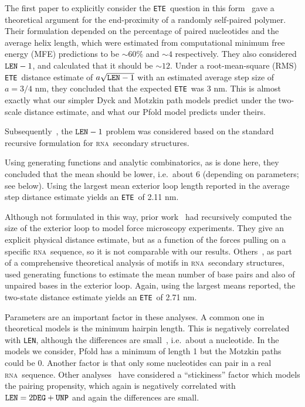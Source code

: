 \documentclass{article}
\newcommand{\RNA}{\textsc{rna}}
\newcommand{\DEG}{{\tt DEG}}
\newcommand{\UNP}{{\tt UNP}}
\newcommand{\ETE}{{\tt ETE}}
\newcommand{\LEN}{{\tt LEN}}
\begin{document}
The first paper to explicitly consider the \ETE\ question in this 
form~\cite{Yoffe:2010} gave a theoretical argument for the end-proximity
of a randomly self-paired polymer.
Their formulation depended on the percentage
of paired nucleotides and the average helix length, which were estimated
from computational minimum free energy (MFE) predictions 
to be $\sim60\%$ and $\sim4$ respectively.
They also considered $\LEN - 1$, and calculated that it should be 
$\sim12$. 
Under a root-mean-square (RMS) \ETE\ distance estimate of $a \sqrt{\LEN - 1}$
with an estimated average step size of $a = 3/4$ nm, they concluded that 
the expected \ETE\ was 3 nm.
This is almost exactly what our simpler Dyck and Motzkin path models predict
under the two-scale distance estimate, and what our Pfold model predicts
under theirs.

Subsequently~\cite{Clote:2011}, the $\LEN - 1$ problem was considered 
based on the standard recursive formulation for \RNA\ secondary structures.

Using generating functions and analytic combinatorics, as is done here,
they concluded that the mean should be lower,
i.e.\ about 6 (depending on parameters; see below).
Using the largest mean exterior loop length reported in the 
average step distance estimate yields an \ETE\ of 2.11 nm. 
 
Although not formulated in this way, prior work~\cite{Gerland:2001} 
had recursively computed the size of the exterior loop to model 
force microscopy experiments.
They give an explicit physical distance estimate, but as a 
function of the forces pulling on a specific \RNA\ sequence, so it 
is not comparable with our results.
Others~\cite{Hofacker:1998}, as part of a comprehensive theoretical 
analysis of motifs in \RNA\ secondary structures,
used generating functions to estimate the mean number of 
base pairs and also of unpaired bases in the exterior loop.
Again, using the largest means reported, the two-state distance
estimate yields an \ETE\ of 2.71 nm.

Parameters are an important factor in these analyses.
A common one in theoretical models is the minimum hairpin length.
This is negatively correlated with \LEN, although the differences
are small~\cite{Clote:2011}, i.e.\ about a nucleotide. 
In the models we consider, 
Pfold has a minimum of length 1 but the Motzkin paths could be 0.
Another factor is that only some nucleotides can pair in a real
\RNA\ sequence.
Other analyses~\cite{Hofacker:1998, Clote:2011} have considered 
a ``stickiness'' factor which models the pairing propensity, 
which again is negatively correlated with $\LEN = 2 \DEG + \UNP$
and again the differences are small.
\end{document}
